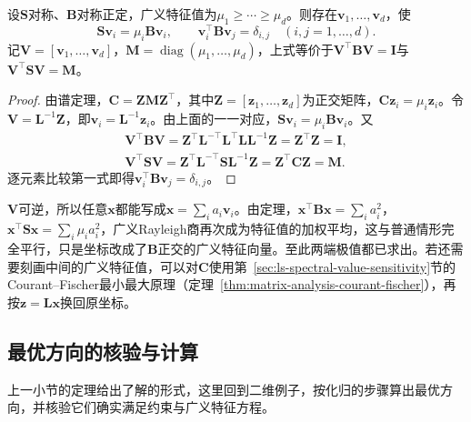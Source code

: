 \begin{theorem}[$\bm B$正交的广义特征向量]
\label{thm:ls-generalized-eigen-b-orthogonal}
设$\bm S$对称、$\bm B$对称正定，广义特征值为$\mu_1\geq\cdots\geq\mu_d$。则存在$\bm v_1,\ldots,\bm v_d$，使
\[
 \bm S\bm v_i=\mu_i\bm B\bm v_i,\qquad \bm v_i^\top\bm B\bm v_j=\delta_{i,j}\quad(i,j=1,\ldots,d).
\]
记$\bm V=[\bm v_1,\ldots,\bm v_d]$，$\bm M=\operatorname{diag}(\mu_1,\ldots,\mu_d)$，上式等价于$\bm V^\top\bm B\bm V=\bm I$与$\bm V^\top\bm S\bm V=\bm M$。
\end{theorem}
\begin{proof}
由谱定理，$\bm C=\bm Z\bm M\bm Z^\top$，其中$\bm Z=[\bm z_1,\ldots,\bm z_d]$为正交矩阵，$\bm C\bm z_i=\mu_i\bm z_i$。令$\bm V=\bm L^{-1}\bm Z$，即$\bm v_i=\bm L^{-1}\bm z_i$。由上面的一一对应，$\bm S\bm v_i=\mu_i\bm B\bm v_i$。又
\[
\begin{gathered}
 \bm V^\top\bm B\bm V=\bm Z^\top\bm L^{-\top}\bm L^\top\bm L\bm L^{-1}\bm Z=\bm Z^\top\bm Z=\bm I,\\
 \bm V^\top\bm S\bm V=\bm Z^\top\bm L^{-\top}\bm S\bm L^{-1}\bm Z=\bm Z^\top\bm C\bm Z=\bm M .
\end{gathered}
\]
逐元素比较第一式即得$\bm v_i^\top\bm B\bm v_j=\delta_{i,j}$。
\end{proof}

$\bm V$可逆，所以任意$\bm x$都能写成$\bm x=\sum_ia_i\bm v_i$。由定理，$\bm x^\top\bm B\bm x=\sum_ia_i^2$，$\bm x^\top\bm S\bm x=\sum_i\mu_ia_i^2$，广义Rayleigh商再次成为特征值的加权平均，这与普通情形完全平行，只是坐标改成了$\bm B$正交的广义特征向量。至此两端极值都已求出。若还需要刻画中间的广义特征值，可以对$\bm C$使用第~\ref{sec:ls-spectral-value-sensitivity}节的Courant--Fischer最小最大原理（定理~\ref{thm:matrix-analysis-courant-fischer}），再按$\bm z=\bm L\bm x$换回原坐标。

\subsection{最优方向的核验与计算}
\label{sec:ls-generalized-eigen-check}

上一小节的定理给出了解的形式，这里回到二维例子，按化归的步骤算出最优方向，并核验它们确实满足约束与广义特征方程。

